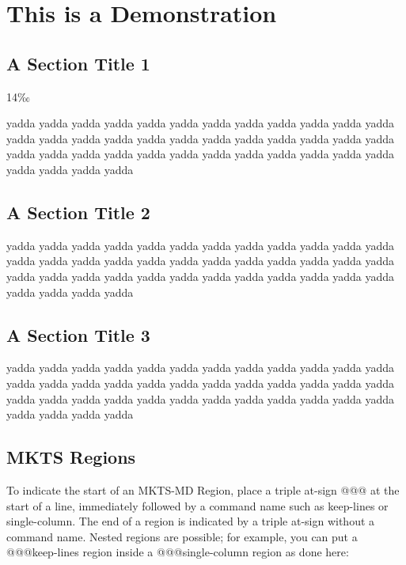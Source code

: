 
\chapter{This is a Demonstration 
}

\section{A Section Title 1 
}


14{\mktsFontfileOptima‰}\par

yadda yadda yadda yadda yadda yadda yadda yadda yadda yadda
yadda yadda yadda yadda yadda yadda yadda yadda yadda yadda
yadda yadda yadda yadda yadda yadda yadda yadda yadda yadda
yadda yadda yadda yadda yadda yadda yadda yadda yadda yadda\par
\section{A Section Title 2 
}


yadda yadda yadda yadda yadda yadda yadda yadda yadda yadda
yadda yadda yadda yadda yadda yadda yadda yadda yadda yadda
yadda yadda yadda yadda yadda yadda yadda yadda yadda yadda
yadda yadda yadda yadda yadda yadda yadda yadda yadda yadda\par
\section{A Section Title 3 
}


yadda yadda yadda yadda yadda yadda yadda yadda yadda yadda
yadda yadda yadda yadda yadda yadda yadda yadda yadda yadda
yadda yadda yadda yadda yadda yadda yadda yadda yadda yadda
yadda yadda yadda yadda yadda yadda yadda yadda yadda yadda\par
\section{MKTS Regions 
}


To indicate the start of an MKTS-MD Region, place a triple at-sign {\mktsFontfileSourcecodeproregular{}@@@}
at the start of a line, immediately followed by a command name such as
{\mktsFontfileSourcecodeproregular{}keep-lines} or {\mktsFontfileSourcecodeproregular{}single-column}. The end of a region is indicated by a
triple at-sign without a command name. Nested regions are possible; for example,
\null\newpage{}you can put a {\mktsFontfileSourcecodeproregular{}@@@keep-lines} region inside a {\mktsFontfileSourcecodeproregular{}@@@single-column} region as
done here:\par

